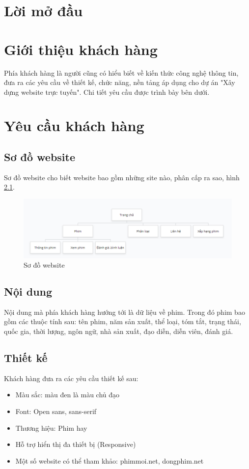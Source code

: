 \documentclass[a4paper]{book}
\begin{document}
\chapter*{Lời mở đầu}
\chapter{Giới thiệu khách hàng}
Phía khách hàng là người cũng có hiểu biết về kiến thức công nghệ thông tin, đưa ra các yêu cầu về thiết kế, chức năng, nền tảng áp dụng cho dự án "Xây dựng website trực tuyến". Chi tiết yêu cầu được trình bày bên dưới.
\chapter{Yêu cầu khách hàng}
\section{Sơ đồ website}
Sơ đồ website cho biết website bao gồm những site nào, phân cấp ra sao, hình \ref{fig:so_do_website}.
\begin{figure}[h!]
	\centering
	\includegraphics[width=\textwidth]{sodo_website.PNG}
	\caption{Sơ đồ website}
	\label{fig:so_do_website}
\end{figure}
\section{Nội dung}
Nội dung mà phía khách hàng hướng tới là dữ liệu về phim. Trong đó phim bao gồm các thuộc tính sau: tên phim, năm sản xuất, thể loại, tóm tắt, trạng thái, quốc gia, thời lượng, ngôn ngữ, nhà sản xuất, đạo diễn, diễn viên, đánh giá.
\section{Thiết kế}
Khách hàng đưa ra các yêu cầu thiết kế sau:
\begin{itemize}
	\item Màu sắc: màu đen là màu chủ đạo
	\item Font: Open sans, sans-serif
	\item Thương hiệu: Phim hay
	\item Hỗ trợ hiển thị đa thiết bị (Responsive)
	\item Một số website có thể tham khảo: phimmoi.net, dongphim.net
\end{itemize}
\end{document}
